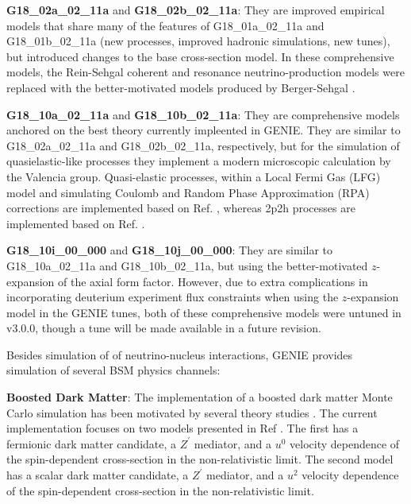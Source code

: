 {\bf G18\_02a\_02\_11a} and {\bf G18\_02b\_02\_11a}: They are improved empirical models that share many of the features of G18\_01a\_02\_11a and G18\_01b\_02\_11a (new processes, improved hadronic simulations, new tunes), but introduced changes to the base cross-section model. In these comprehensive models, the Rein-Sehgal coherent and resonance neutrino-production models \cite{Rein:2006di, Rein:1980wg} were replaced with the better-motivated models produced by Berger-Sehgal \cite{Berger:2008xs, Berger:2007rq}.

{\bf G18\_10a\_02\_11a} and {\bf G18\_10b\_02\_11a}: They are comprehensive models anchored on the best theory currently impleented in GENIE. They are similar to G18\_02a\_02\_11a and G18\_02b\_02\_11a, respectively, but for the simulation of quasielastic-like processes they implement a modern microscopic calculation by the Valencia group. Quasi-elastic processes, within a Local Fermi Gas (LFG) model and simulating Coulomb and Random Phase Approximation (RPA) corrections are implemented based on Ref. \cite{Nieves:2004wx}, whereas 2p2h processes are implemented based on Ref. \cite{Nieves:2011pp}.

{\bf G18\_10i\_00\_000} and {\bf G18\_10j\_00\_000}: They are similar to G18\_10a\_02\_11a and G18\_10b\_02\_11a, but using the better-motivated $z$-expansion \cite{Hill:2010yb} of the axial form factor. However, due to extra complications in incorporating deuterium experiment flux constraints when using the $z$-expansion model in the GENIE tunes, both of these comprehensive models were untuned in v3.0.0, though a tune will be made available in a future revision. 

Besides simulation of of neutrino-nucleus interactions, GENIE provides simulation of several BSM physics channels:

{\bf Boosted Dark Matter}: The implementation of a boosted dark matter Monte Carlo simulation has been motivated by several theory studies \cite{Agashe:2014yua, Berger:2014sqa, Kong:2014mia, Cherry:2015oca, Kopp:2015bfa, Necib:2016aez, Alhazmi:2016qcs, Kim:2016zjx}. The current implementation focuses on two models presented in Ref \cite{Berger:2014sqa}. The first has a fermionic dark matter candidate, a $Z^\prime$ mediator, and a $u^0$ velocity dependence of the spin-dependent cross-section in the non-relativistic limit. The second model has a scalar dark matter candidate, a $Z^\prime$ mediator, and a $u^2$ velocity dependence of the spin-dependent cross-section in the non-relativistic limit.

